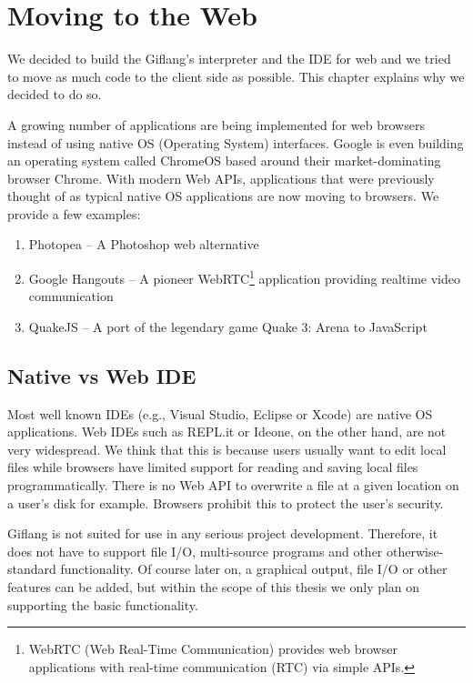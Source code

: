 \chapter{Moving to the Web}
\label{chap2}

We decided to build the Giflang's interpreter and the IDE for web and we tried to move as much code to the client side as possible. This chapter explains
why we decided to do so.

A growing number of applications are being implemented for web browsers instead of using native OS (Operating System) interfaces. Google is even building an
operating system called ChromeOS based around their market-dominating browser Chrome. With modern Web APIs, applications that were previously
thought of as typical native OS applications are now moving to browsers. We provide a few examples:
\begin{enumerate}
\item Photopea \cite{Photopea} -- A Photoshop web alternative
\item Google Hangouts \cite{Hangouts} -- A pioneer WebRTC\footnote{WebRTC (Web Real-Time Communication) provides web browser 
applications with real-time communication (RTC) via simple APIs.} application providing realtime video communication
\item QuakeJS \cite{QuakeJS} -- A port of the legendary game Quake 3: Arena to JavaScript
\end{enumerate}

\section{Native vs Web IDE}
Most well known IDEs (e.g., Visual Studio, Eclipse or Xcode) are native OS applications. Web IDEs such as REPL.it or Ideone, on the other hand,
are not very widespread. We think that this is because users usually want to edit local files while browsers have limited support for reading
and saving local files programmatically. There is no Web API to overwrite a file at a given location on a user's disk for example.
Browsers prohibit this to protect the user's security.

Giflang is not suited for use in any serious project development. Therefore, it does not have to support file I/O, multi-source programs
and other otherwise-standard functionality. Of course later on, a graphical output, file I/O or other features can be added, but within the
scope of this thesis we only plan on supporting the basic functionality.

